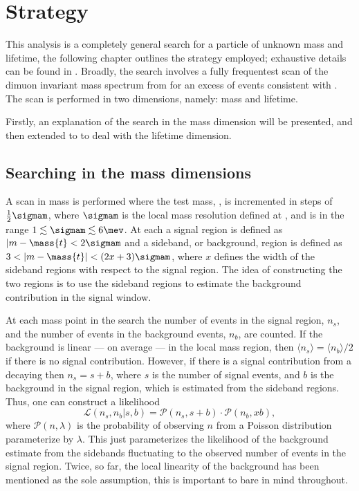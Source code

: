 \section{Strategy}
\label{sec:db:strategy}

This analysis is a completely general search for a particle of unknown mass and lifetime, the
following chapter outlines the strategy employed; exhaustive details can be found in
.
Broadly, the search involves a fully frequentest scan of the dimuon invariant mass spectrum from
\btokstrmumu for an excess of events consistent with \dbtomumu.
The scan is performed in two dimensions, namely: mass and lifetime.

Firstly, an explanation of the search in the mass dimension will be presented, and then extended to
to deal with the lifetime dimension.


\subsection{Searching in the mass dimensions}
A scan in mass is performed where the test mass, , is incremented in steps of
$\tfrac12\sigmam$, where $\sigmam$ is the local mass resolution defined at , and is in the
range $1\lesssim\sigmam\lesssim6\mev$.
At each  a signal region is defined as $|m-\mass{t}<2\sigmam$ and a sideband, or
background, region is defined as $3<|m-\mass{t}|<(2x+3)\sigmam$, where
$x$ defines the width of the sideband regions with respect to the signal region.
The idea of constructing the two regions is to use the sideband regions to estimate the background
contribution in the signal window.

At each mass point in the search the number of events in the signal region, $n_s$, and the number
of events in the background events, $n_b$, are counted.
If the background is linear --- on average --- in the local mass region, then
$\langle n_s\rangle=\langle n_b\rangle/2$ if there is no signal contribution.
However, if there is a signal contribution from a decaying \db then $n_s=s+b$, where $s$ is the
number of signal events, and $b$ is the background in the signal region, which is estimated from the
sideband regions.
Thus, one can construct a likelihood
\begin{equation}
  \mathcal{L}(n_s, n_b | s, b) =
  \mathcal{P}(n_s, s+b) \cdot
  \mathcal{P}(n_b, xb),
  \label{eq:db:like1}
\end{equation}
where $\mathcal{P}(n, \lambda)$ is the probability of observing $n$ from a Poisson distribution
parameterize by $\lambda$.
This just parameterizes the likelihood of the background estimate from the sidebands fluctuating to
the observed number of events in the signal region.
Twice, so far, the local linearity of the background has been mentioned as the sole assumption,
this is important to bare in mind throughout.

